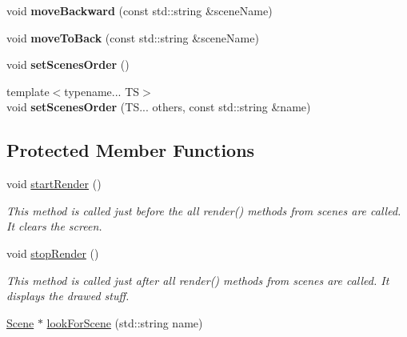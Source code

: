 \begin{DoxyCompactItemize}
void {\bfseries move\+Backward} (const std\+::string \&scene\+Name)
\item 
\mbox{\label{classzt_1_1_scene_manager_acb09572788f74b46f0c445c5b47b9489}} 
void {\bfseries move\+To\+Back} (const std\+::string \&scene\+Name)
\item 
\mbox{\label{classzt_1_1_scene_manager_a4aa593d96a651a6512da4d1c4a53b345}} 
void {\bfseries set\+Scenes\+Order} ()
\item 
\mbox{\label{classzt_1_1_scene_manager_a16dcc1decc831c9eeef7910c4ed87e02}} 
{\footnotesize template$<$typename... TS$>$ }\\void {\bfseries set\+Scenes\+Order} (T\+S... others, const std\+::string \&name)
\end{DoxyCompactItemize}
\subsection*{Protected Member Functions}
\begin{DoxyCompactItemize}
\item 
\mbox{\label{classzt_1_1_scene_manager_a4390bf866b30292dbf27eae3f56bfa31}} 
void \hyperlink{classzt_1_1_scene_manager_a4390bf866b30292dbf27eae3f56bfa31}{start\+Render} ()
\begin{DoxyCompactList}\small\item\em This method is called just before the all render() methods from scenes are called. It clears the screen. \end{DoxyCompactList}\item 
\mbox{\label{classzt_1_1_scene_manager_a66015a7d3051185c09a03ad184101b89}} 
void \hyperlink{classzt_1_1_scene_manager_a66015a7d3051185c09a03ad184101b89}{stop\+Render} ()
\begin{DoxyCompactList}\small\item\em This method is called just after all render() methods from scenes are called. It displays the drawed stuff. \end{DoxyCompactList}\item 
\hyperlink{classzt_1_1_scene}{Scene} $\ast$ \hyperlink{classzt_1_1_scene_manager_a8587fc624ef29ac0d71ff72a8a653066}{look\+For\+Scene} (std\+::string name)
\end{DoxyCompactItemize}
